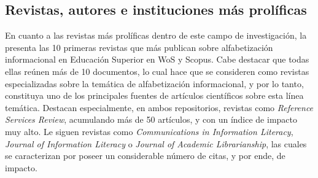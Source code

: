 \documentclass{textolivre}
\begin{document}
\subsection{Revistas, autores e instituciones más prolíficas
}
En cuanto a las revistas más prolíficas dentro de este campo de investigación, la  presenta las 10 primeras revistas que más publican sobre alfabetización informacional en Educación Superior en WoS y Scopus. Cabe destacar que todas ellas reúnen más de 10 documentos, lo cual hace que se consideren como revistas especializadas  sobre la temática de alfabetización informacional, y por lo tanto, constituya uno de los principales fuentes de artículos científicos sobre esta línea temática. Destacan especialmente, en ambos repositorios, revistas como \emph{Reference Services Review}, acumulando más de 50 artículos, y con un índice de impacto muy alto. Le siguen revistas como \emph{Communications in Information Literacy}, \emph{Journal of Information Literacy} o \emph{Journal of Academic Librarianship}, las cuales se caracterizan por poseer un considerable número de citas, y por ende, de impacto.
\end{document}
